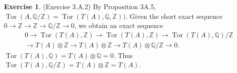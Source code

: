 \documentclass[12pt, psamsfonts]{amsart}
\theoremstyle{definition}
\newtheorem*{exer}{Exercise}
\theoremstyle{remark}
\DeclareMathOperator{\Tor}{Tor}
\numberwithin{equation}{section}
\begin{document}
\begin{exer}{(Exercise 3.A.2)}
  By Proposition 3A.5, $\Tor(A, \mathbb{Q} / \mathbb{Z}) = \Tor(T(A), \mathbb{Q}, \mathbb{Z}))$.
  Given the short exact sequence $0 \rightarrow \mathbb{Z} \rightarrow \mathbb{Z} \rightarrow \mathbb{Q} / \mathbb{Z} \rightarrow 0$, we obtain an exact sequence
  \begin{align*}
    &0 \rightarrow \Tor(T(A), \mathbb{Z}) \rightarrow \Tor(T(A), \mathbb{Z}) \rightarrow \Tor(T(A), \mathbb{Q}) / \mathbb{Z} \\
    &\rightarrow T(A) \otimes \mathbb{Z} \rightarrow T(A) \otimes \mathbb{Z} \rightarrow T(A) \otimes \mathbb{Q} / \mathbb{Z} \rightarrow 0.
  \end{align*}
  $\Tor(T(A), \mathbb{Q}) = T(A) \otimes \mathbb{Q} = 0$.
  Thus $\Tor(T(A), \mathbb{Q} / \mathbb{Z}) = T(A) \otimes \mathbb{Z} = T(A)$.
\end{exer}
\end{document}
